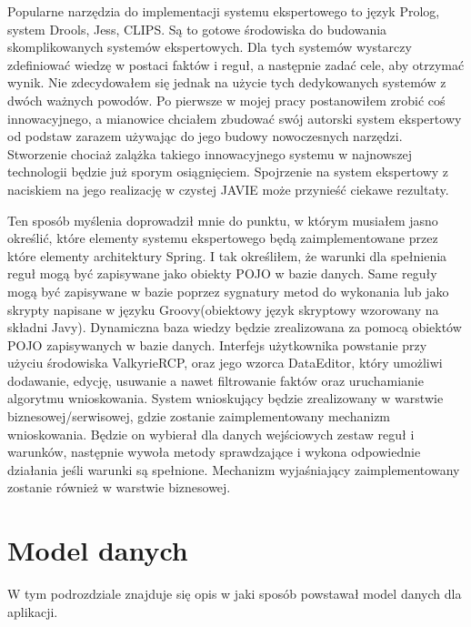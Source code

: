 Popularne narzędzia do implementacji systemu ekspertowego to język Prolog, system Drools, Jess, CLIPS. Są to gotowe środowiska do budowania skomplikowanych systemów ekspertowych. Dla tych systemów wystarczy zdefiniować wiedzę w postaci faktów i reguł, a następnie zadać cele, aby otrzymać wynik. Nie zdecydowałem się jednak na użycie tych dedykowanych systemów z dwóch ważnych powodów. Po pierwsze w mojej pracy postanowiłem zrobić coś innowacyjnego, a mianowice chciałem zbudować swój autorski system ekspertowy od podstaw zarazem używając do jego budowy nowoczesnych narzędzi. Stworzenie chociaż zalążka takiego innowacyjnego systemu w najnowszej technologii będzie już sporym osiągnięciem. Spojrzenie na system ekspertowy z naciskiem na jego realizację w czystej JAVIE może przynieść ciekawe rezultaty. 

Ten sposób myślenia doprowadził mnie do punktu, w którym musiałem jasno określić, które elementy systemu ekspertowego będą zaimplementowane przez które elementy architektury Spring. I tak określiłem, że warunki dla spełnienia reguł mogą być zapisywane jako obiekty POJO w bazie danych. Same reguły mogą być zapisywane w bazie poprzez sygnatury metod do wykonania lub jako skrypty napisane w języku Groovy(obiektowy język skryptowy wzorowany na składni Javy). Dynamiczna baza wiedzy będzie zrealizowana za pomocą obiektów POJO zapisywanych w bazie danych. Interfejs użytkownika  powstanie przy użyciu środowiska ValkyrieRCP, oraz jego wzorca DataEditor, który umożliwi dodawanie, edycję, usuwanie a nawet filtrowanie faktów oraz uruchamianie algorytmu wnioskowania. System wnioskujący będzie zrealizowany w warstwie biznesowej/serwisowej, gdzie zostanie zaimplementowany mechanizm wnioskowania. Będzie on wybierał dla danych wejściowych zestaw reguł i warunków, następnie wywoła metody sprawdzające i wykona odpowiednie działania jeśli warunki są spełnione. Mechanizm wyjaśniający zaimplementowany zostanie również w warstwie biznesowej.


\section{Model danych}
\label{sec:modelDanych}

W tym podrozdziale znajduje się opis w jaki sposób powstawał model danych dla aplikacji.

